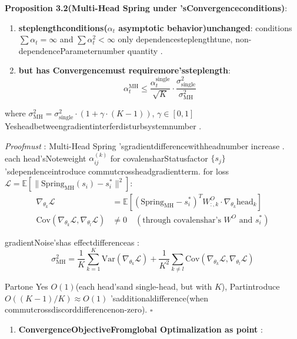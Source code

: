 \documentclass[
  12pt,
]{article}
\providecommand{\tightlist}{%
  \setlength{\itemsep}{0pt}\setlength{\parskip}{0pt}}
\begin{document}
\textbf{Proposition 3.2(Multi-Head Spring under 'sConvergenceconditions)}: 

\begin{enumerate}
\def\labelenumi{(\arabic{enumi})}
\item
  \textbf{steplengthconditions(\(\alpha_t\) asymptotic behavior)unchanged}: conditions
  \(\sum \alpha_t = \infty\) and  \(\sum \alpha_t^2 < \infty\)
  only dependencesteplengthtune, non-dependenceParameternumber quantity . 
\item
  \textbf{but has Convergencemust requiremore'ssteplength}: 
  \[\boxed{\alpha_t^{\text{MH}} \leq \frac{\alpha_t^{\text{single}}}{\sqrt{K}} \cdot \frac{\sigma^2_{\text{single}}}{\sigma^2_{\text{MH}}}}\]
\end{enumerate}

where
\(\sigma^2_{\text{MH}} = \sigma^2_{\text{single}} \cdot (1 + \gamma \cdot (K - 1))\), \(\gamma \in [0, 1]\)
Yesheadbetweengradientinterferdisturbsystemnumber . 

\emph{Proofmust }: Multi-Head Spring
'sgradientdifferencewithheadnumber increase . each head'sNoteweight \(\alpha_{ij}^{(k)}\)
for covalensharStatusfactor  \(\{s_j\}\) 'sdependenceintroduce commutcrossheadgradientterm. for loss
\(\mathcal{L} = \mathbb{E}[\|\text{Spring}_{\text{MH}}(s_i) - s_i^*\|^2]\): 
\begin{align*}
\nabla_{\theta_k} \mathcal{L} &= \mathbb{E}\left[(\text{Spring}_{\text{MH}} - s_i^*)^T W^O_{:,k} \cdot \nabla_{\theta_k} \text{head}_k\right] \\
\text{Cov}(\nabla_{\theta_k} \mathcal{L}, \nabla_{\theta_l} \mathcal{L}) &\neq 0 \quad (\text{through covalenshar's } W^O \text{ and  } s_i^*)
\end{align*}

gradientNoise'shas effectdifferenceas : 
\[\sigma^2_{\text{MH}} = \frac{1}{K} \sum_{k=1}^{K} \text{Var}(\nabla_{\theta_k} \mathcal{L}) + \frac{1}{K^2} \sum_{k \neq l} \text{Cov}(\nabla_{\theta_k} \mathcal{L}, \nabla_{\theta_l} \mathcal{L})\]

Partone Yes \(O(1)\)(each head'sand single-head, but with  \(K\)), Partintroduce 
\(O((K-1)/K) \approx O(1)\)
'sadditionaldifference(when commutcrossdiscorddifferencenon-zero). \(\square\)

\begin{enumerate}
\def\labelenumi{(\arabic{enumi})}
\setcounter{enumi}{2}
\tightlist
\item
  \textbf{ConvergenceObjectiveFromglobal Optimalization as point }: 
\end{enumerate}
\end{document}

